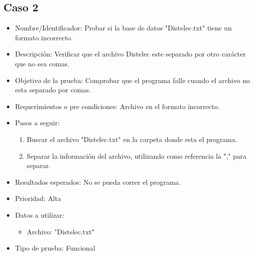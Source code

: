 \documentclass[conference]{IEEEtran}
\begin{document}
\subsection{Caso 2}
\begin{itemize}
\item Nombre/Identificador: Probar si la base de datos "Distelec.txt" tiene un formato incorrecto.
\item Descripción: Verificar que el archivo Distelec este separado por otro carácter que no sea comas.
\item Objetivo de la prueba: Comprobar que el programa falle cuando el archivo no esta separado por comas. 
\item Requerimientos o pre condiciones: Archivo en el formato incorrecto.
\item Pasos a seguir: 
\begin{enumerate}
\item Buscar el archivo "Distelec.txt" en la carpeta donde esta el programa.
\item Separar la información del archivo, utilizando como referencia la "," para separar.
\end{enumerate}
\item Resultados esperados: No se pueda correr el programa.
\item Prioridad: Alta
\item Datos a utilizar: 
\begin{itemize}
\item Archivo: "Distelec.txt"
\end{itemize}
\item Tipo de prueba: Funcional
\end{itemize}
\end{document}
